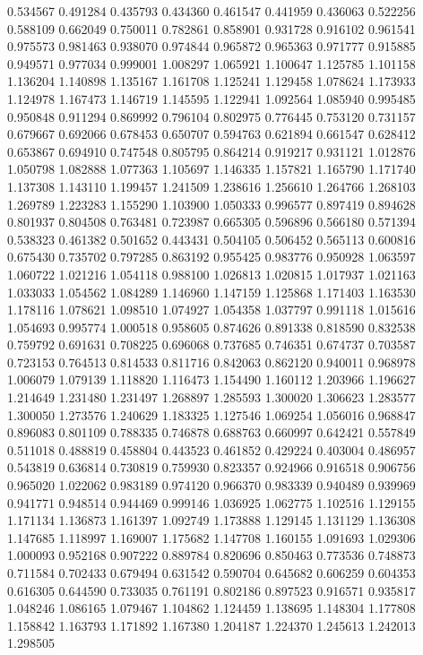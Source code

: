 0.534567
0.491284
0.435793
0.434360
0.461547
0.441959
0.436063
0.522256
0.588109
0.662049
0.750011
0.782861
0.858901
0.931728
0.916102
0.961541
0.975573
0.981463
0.938070
0.974844
0.965872
0.965363
0.971777
0.915885
0.949571
0.977034
0.999001
1.008297
1.065921
1.100647
1.125785
1.101158
1.136204
1.140898
1.135167
1.161708
1.125241
1.129458
1.078624
1.173933
1.124978
1.167473
1.146719
1.145595
1.122941
1.092564
1.085940
0.995485
0.950848
0.911294
0.869992
0.796104
0.802975
0.776445
0.753120
0.731157
0.679667
0.692066
0.678453
0.650707
0.594763
0.621894
0.661547
0.628412
0.653867
0.694910
0.747548
0.805795
0.864214
0.919217
0.931121
1.012876
1.050798
1.082888
1.077363
1.105697
1.146335
1.157821
1.165790
1.171740
1.137308
1.143110
1.199457
1.241509
1.238616
1.256610
1.264766
1.268103
1.269789
1.223283
1.155290
1.103900
1.050333
0.996577
0.897419
0.894628
0.801937
0.804508
0.763481
0.723987
0.665305
0.596896
0.566180
0.571394
0.538323
0.461382
0.501652
0.443431
0.504105
0.506452
0.565113
0.600816
0.675430
0.735702
0.797285
0.863192
0.955425
0.983776
0.950928
1.063597
1.060722
1.021216
1.054118
0.988100
1.026813
1.020815
1.017937
1.021163
1.033033
1.054562
1.084289
1.146960
1.147159
1.125868
1.171403
1.163530
1.178116
1.078621
1.098510
1.074927
1.054358
1.037797
0.991118
1.015616
1.054693
0.995774
1.000518
0.958605
0.874626
0.891338
0.818590
0.832538
0.759792
0.691631
0.708225
0.696068
0.737685
0.746351
0.674737
0.703587
0.723153
0.764513
0.814533
0.811716
0.842063
0.862120
0.940011
0.968978
1.006079
1.079139
1.118820
1.116473
1.154490
1.160112
1.203966
1.196627
1.214649
1.231480
1.231497
1.268897
1.285593
1.300020
1.306623
1.283577
1.300050
1.273576
1.240629
1.183325
1.127546
1.069254
1.056016
0.968847
0.896083
0.801109
0.788335
0.746878
0.688763
0.660997
0.642421
0.557849
0.511018
0.488819
0.458804
0.443523
0.461852
0.429224
0.403004
0.486957
0.543819
0.636814
0.730819
0.759930
0.823357
0.924966
0.916518
0.906756
0.965020
1.022062
0.983189
0.974120
0.966370
0.983339
0.940489
0.939969
0.941771
0.948514
0.944469
0.999146
1.036925
1.062775
1.102516
1.129155
1.171134
1.136873
1.161397
1.092749
1.173888
1.129145
1.131129
1.136308
1.147685
1.118997
1.169007
1.175682
1.147708
1.160155
1.091693
1.029306
1.000093
0.952168
0.907222
0.889784
0.820696
0.850463
0.773536
0.748873
0.711584
0.702433
0.679494
0.631542
0.590704
0.645682
0.606259
0.604353
0.616305
0.644590
0.733035
0.761191
0.802186
0.897523
0.916571
0.935817
1.048246
1.086165
1.079467
1.104862
1.124459
1.138695
1.148304
1.177808
1.158842
1.163793
1.171892
1.167380
1.204187
1.224370
1.245613
1.242013
1.298505
